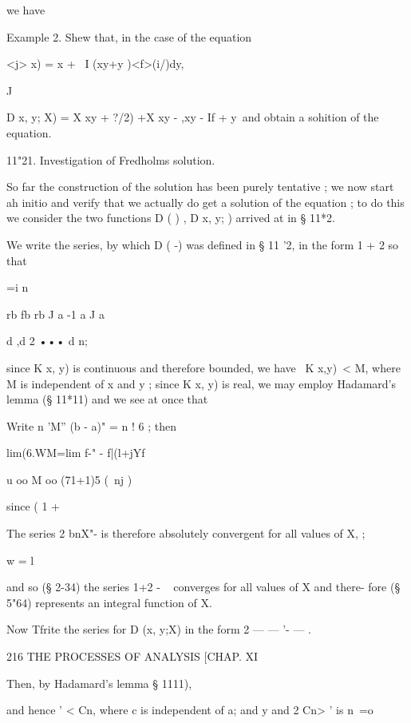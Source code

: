 we have 



Example 2. Shew that, in the case of the equation 

<j> x) = x + \ I (xy+y )<f>(i/)dy, 

J 

D  x, y; X) = X  xy + ?/2) +X    xy  -  ,xy - If + y\ 
and obtain a sohition of the equation. 

11"21. Investigation of Fredholms solution. 

So far the construction of the solution has been purely tentative ; we now 
start ah initio and verify that we actually do get a solution of the equation ; 
to do this we consider the two functions D ( ) , D x, y;  )  arrived at in § 11*2. 

We write the series, by which D ( -) was defined in § 11 '2, in the form 
1 + 2   so that 



 =i n\ 



rb fb rb 
J a -1 a J a 






d ,d 2 ••• d n; 



since K  x, y) is continuous and therefore bounded, we have \ K  x,y)\ <  M, 
where M is independent of x and y ; since K  x, y) is real, we may employ 
Hadamard's lemma (§ 11*11) and we see at once that 

Write n 'M'' (b - a)" = n ! 6  ; then 

lim(6.WM=lim f-" - f|(l+jYf 

u oo M oo (71+1)5 (\ nj ) 



since ( 1 + 



The series 2 bnX"- is therefore absolutely convergent for all values of X, ; 

w = l 

and so (§ 2-34) the series 1+2 - ~ converges for all values of X and there- 
fore (§ 5"64) represents an integral function of X. 

Now Tfrite the series for D (x, y;X) in the form 2 — — '- — . 



216 THE PROCESSES OF ANALYSIS [CHAP. XI 

Then, by Hadamard's lemma  § 1111), 

and hence   '   < Cn, where c  is independent of a; and y and 2 Cn>  '  is 
n\    =o 

